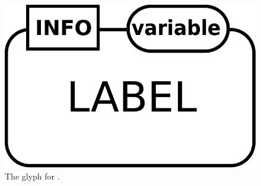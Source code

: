 \begin{figure}[H]
  \centering
  \includegraphics[scale = 0.3]{images/entity}
  \caption{The \ER glyph for .}
  \label{fig:entity}
\end{figure}

\normalcolor

